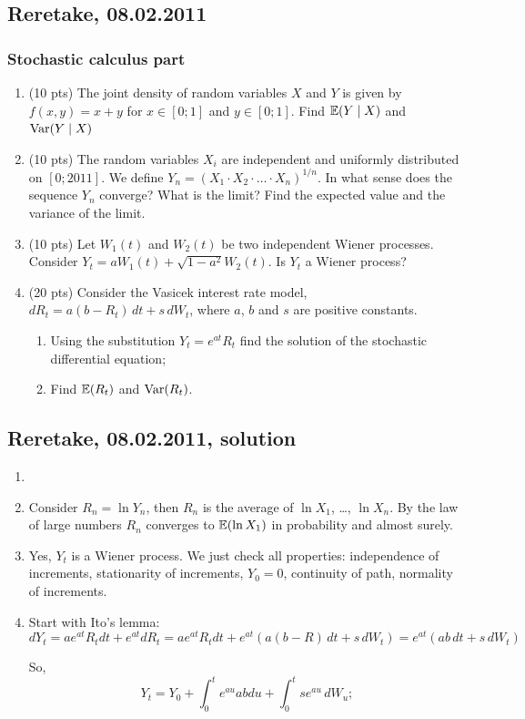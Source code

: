 \documentclass[12pt, a4paper]{article}
\begin{document}
\subsection{Reretake, 08.02.2011}

\subsubsection*{Stochastic calculus part}

\begin{enumerate}

\item (10 pts) The joint density of random variables $X$ and $Y$ is given by $f(x,y)=x+y$ for $x\in [0;1]$ and $y\in[0;1]$. Find $\operatorname{\mathbb{E}}(Y \mid X)$ and $\operatorname{Var}(Y \mid X)$
\item (10 pts) The random variables $X_i$ are independent and uniformly distributed on $[0;2011]$. We define $Y_n=(X_1\cdot X_2\cdot \ldots \cdot X_n)^{1/n}$. In what sense does the sequence $Y_n$ converge? What is the limit? Find the expected value and the variance of the limit.
\item (10 pts) Let $W_1(t)$ and $W_2(t)$ be two independent Wiener processes. Consider $Y_t=aW_1(t)+\sqrt{1-a^2}W_2 (t)$. Is $Y_t$ a Wiener process?
\item (20 pts) Consider the Vasicek interest rate model, $dR_t=a(b-R_t) \, dt+s \, dW_t$, where $a$, $b$ and $s$ are positive constants.
\begin{enumerate}
\item Using the substitution $Y_t=e^{at} R_t$ find the solution of the stochastic differential equation;
\item Find $\operatorname{\mathbb{E}}(R_t)$ and $\operatorname{Var}(R_t)$.
\end{enumerate}


\end{enumerate}

\subsection{Reretake, 08.02.2011, solution}

\begin{enumerate}
\item
\item Consider $R_n = \ln Y_n$, then $R_n$ is the average of $\ln X_1$, \ldots, $\ln X_n$. By the law of large numbers $R_n$ converges to $\operatorname{\mathbb{E}}(\ln X_1)$ in probability and almost surely.
\item Yes, $Y_t$ is a Wiener process. We just check all properties: independence of increments, stationarity of increments, $Y_0=0$, continuity of path, normality of increments.
\item Start with Ito's lemma:
\[
dY_t = a e^{at} R_t dt + e^{at} dR_t =
a e^{at} R_t dt + e^{at} (a(b-R) \, dt+s \, dW_t) =
 e^{at} (ab \, dt+s \, dW_t)
\]

So,
\[
Y_t = Y_0 + \int_0^t e^{au}ab du + \int_0^t se^{au}\,dW_u;
\]

\end{enumerate}
\end{document}
